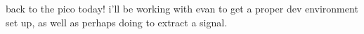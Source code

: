 back to the pico today! i'll be working with evan to get a proper dev
environment set up, as well as perhaps doing \dsp to extract a signal.
